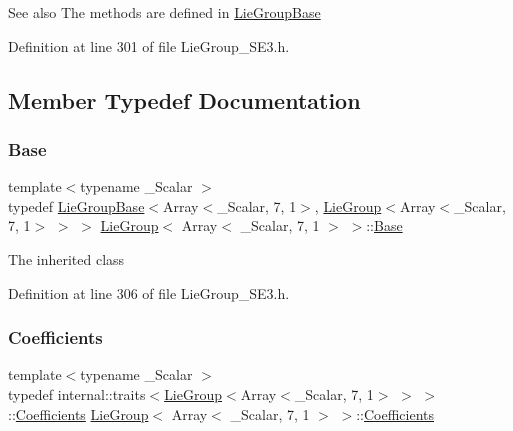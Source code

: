 \begin{DoxySeeAlso}{See also}
The methods are defined in \hyperlink{class_lie_group_base}{Lie\+Group\+Base} 
\end{DoxySeeAlso}


Definition at line 301 of file Lie\+Group\+\_\+\+S\+E3.\+h.



\subsection{Member Typedef Documentation}
\hypertarget{class_lie_group_3_01_array_3_01___scalar_00_017_00_011_01_4_01_4_a2f9c6357e55ba5e895a849c32e18b3c4}{}\label{class_lie_group_3_01_array_3_01___scalar_00_017_00_011_01_4_01_4_a2f9c6357e55ba5e895a849c32e18b3c4} 
\subsubsection{\texorpdfstring{Base}{Base}}
{\footnotesize\ttfamily template$<$typename \+\_\+\+Scalar $>$ \\
typedef \hyperlink{class_lie_group_base}{Lie\+Group\+Base}$<$Array$<$\+\_\+\+Scalar, 7, 1$>$, \hyperlink{class_lie_group}{Lie\+Group}$<$Array$<$\+\_\+\+Scalar, 7, 1$>$ $>$ $>$ \hyperlink{class_lie_group}{Lie\+Group}$<$ Array$<$ \+\_\+\+Scalar, 7, 1 $>$ $>$\+::\hyperlink{class_lie_group_3_01_array_3_01___scalar_00_017_00_011_01_4_01_4_a2f9c6357e55ba5e895a849c32e18b3c4}{Base}\hspace{0.3cm}{\ttfamily [protected]}}

The inherited class 

Definition at line 306 of file Lie\+Group\+\_\+\+S\+E3.\+h.

\hypertarget{class_lie_group_3_01_array_3_01___scalar_00_017_00_011_01_4_01_4_aa5d0fac468a8bdbb468bf2218b93ee0e}{}\label{class_lie_group_3_01_array_3_01___scalar_00_017_00_011_01_4_01_4_aa5d0fac468a8bdbb468bf2218b93ee0e} 
\subsubsection{\texorpdfstring{Coefficients}{Coefficients}}
{\footnotesize\ttfamily template$<$typename \+\_\+\+Scalar $>$ \\
typedef internal\+::traits$<$\hyperlink{class_lie_group}{Lie\+Group}$<$Array$<$\+\_\+\+Scalar, 7, 1$>$ $>$ $>$\+::\hyperlink{class_lie_group_3_01_array_3_01___scalar_00_017_00_011_01_4_01_4_aa5d0fac468a8bdbb468bf2218b93ee0e}{Coefficients} \hyperlink{class_lie_group}{Lie\+Group}$<$ Array$<$ \+\_\+\+Scalar, 7, 1 $>$ $>$\+::\hyperlink{class_lie_group_3_01_array_3_01___scalar_00_017_00_011_01_4_01_4_aa5d0fac468a8bdbb468bf2218b93ee0e}{Coefficients}}

